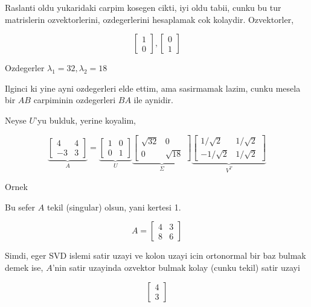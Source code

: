 \documentclass[12pt,fleqn]{article}\usepackage{../common}
\begin{document}
Raslanti oldu yukaridaki carpim kosegen cikti, iyi oldu tabii, cunku bu tur
matrislerin ozvektorlerini, ozdegerlerini hesaplamak cok
kolaydir. Ozvektorler, 

\[ 
\left[\begin{array}{r}
1 \\ 0
\end{array}\right],
\left[\begin{array}{r}
0 \\ 1
\end{array}\right]
 \]

Ozdegerler $\lambda_1 = 32, \lambda_2 = 18$

Ilginci ki yine ayni ozdegerleri elde ettim, ama sasirmamak lazim, cunku
mesela bir $AB$ carpiminin ozdegerleri $BA$ ile aynidir. 

Neyse $U$'yu bulduk, yerine koyalim, 

\[ 
\underbrace{
\left[\begin{array}{rr}
4 & 4 \\ -3 & 3
\end{array}\right] 
}_{A}
=
\underbrace{
\left[\begin{array}{rr}
1 & 0 \\ 0 & 1 
\end{array}\right]
}_{U}
\underbrace{
\left[\begin{array}{rr}
\sqrt{ 32} & 0 \\ 0 & \sqrt{ 18}
\end{array}\right]
}_{\Sigma}
\underbrace{
\left[\begin{array}{rr}
1/\sqrt{ 2} & 1/\sqrt{ 2} \\ -1/\sqrt{ 2} & 1/\sqrt{ 2}
\end{array}\right]
}_{V^T}
 \]

Ornek 

Bu sefer $A$ tekil (singular) olsun, yani kertesi 1. 

\[ A = \left[\begin{array}{rr}
4 & 3 \\ 8 & 6
\end{array}\right] \]

Simdi, eger SVD islemi satir uzayi ve kolon uzayi icin ortonormal bir baz
bulmak demek ise, $A$'nin satir uzayinda ozvektor bulmak kolay (cunku
tekil) satir uzayi

\[ 
\left[\begin{array}{r}
4 \\ 3
\end{array}\right]
 \]
\end{document}
